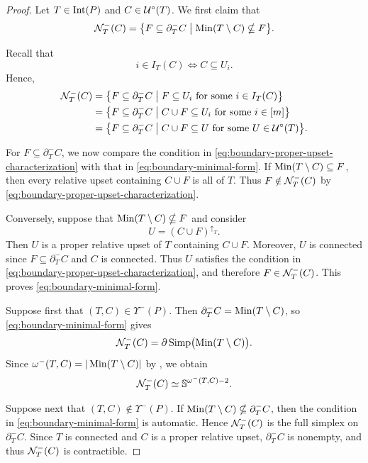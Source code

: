 \begin{proof}
Let $T\in \operatorname{Int}(P)$ and $C\in \mathcal U^\circ(T)$.
We first claim that
\begin{equation}
\label{eq:boundary-minimal-form}
\mathcal N_T^-(C)
=
\bigl\{
F\subseteq\partial_T^-C
\bigm|
\operatorname{Min}(T\setminus C)\nsubseteq F
\bigr\}.
\end{equation}


Recall that
\[
i\in I_T(C)
\Longleftrightarrow
C\subseteq U_i.
\]
Hence, 
\begin{align}
\mathcal N_T^-(C)
&=
\bigl\{
F\subseteq\partial_T^-C
\bigm|
F\subseteq U_i
\text{ for some }i\in I_T(C)
\bigr\}
\notag
\\
&=
\bigl\{
F\subseteq\partial_T^-C
\bigm|
C\cup F\subseteq U_i
\text{ for some }i\in[m]
\bigr\}
\notag
\\
&=
\bigl\{
F\subseteq\partial_T^-C
\bigm|
C\cup F\subseteq U
\text{ for some }U\in\mathcal U^\circ(T)
\bigr\}.
\label{eq:boundary-proper-upset-characterization}
\end{align}

For $F\subseteq\partial_T^-C$, we now compare the condition in
\eqref{eq:boundary-proper-upset-characterization} with that in
\eqref{eq:boundary-minimal-form}. If
$\operatorname{Min}(T\setminus C)\subseteq F$,
then every relative upset containing $C\cup F$ is all of $T$.
Thus $F\notin\mathcal N_T^-(C)$ by
\eqref{eq:boundary-proper-upset-characterization}.

Conversely, suppose that
$\operatorname{Min}(T\setminus C)\nsubseteq F$
and consider 
\[
U=(C\cup F)^{\uparrow_T}.
\]
Then $U$ is a proper relative upset of $T$ containing $C\cup F$. 
Moreover, $U$ is connected since $F\subseteq\partial_T^-C$ and $C$ is connected. Thus $U$ satisfies the condition in
\eqref{eq:boundary-proper-upset-characterization}, and therefore
$F\in\mathcal N_T^-(C)$. This proves
\eqref{eq:boundary-minimal-form}.


Suppose first that $(T,C)\in\Upsilon^-(P)$. Then
$\partial_T^-C=\operatorname{Min}(T\setminus C)$, so
\eqref{eq:boundary-minimal-form} gives
\[
\mathcal N_T^-(C)
=
\partial\operatorname{Simp}\bigl(\operatorname{Min}(T\setminus C)\bigr).
\]
Since
$\omega^-(T,C)=|\operatorname{Min}(T\setminus C)|$ by
, we obtain
\[
\mathcal N_T^-(C)
\simeq
\mathbb S^{\omega^-(T,C)-2}.
\]


Suppose next that $(T,C)\notin\Upsilon^-(P)$. If
$\operatorname{Min}(T\setminus C)\nsubseteq\partial_T^-C$, then the condition in
\eqref{eq:boundary-minimal-form} is automatic. Hence $\mathcal N_T^-(C)$ is
the full simplex on $\partial_T^-C$. Since $T$ is connected and
$C$ is a proper relative upset, $\partial_T^-C$ is nonempty, and
thus $\mathcal N_T^-(C)$ is contractible.


\end{proof}
